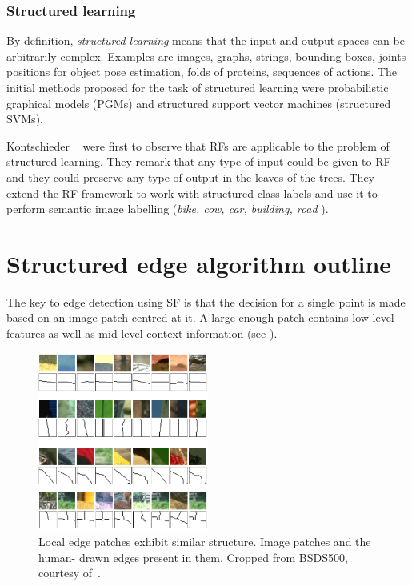 \subsubsection{Structured learning}
By definition, {\it structured learning} means that the input and output spaces can be arbitrarily complex. Examples are images, graphs, strings, bounding boxes, joints positions for object pose estimation, folds of proteins, sequences of actions. The initial methods proposed for the task of structured learning were probabilistic graphical models (PGMs) and structured support vector machines (structured SVMs).

Kontschieder \etal~\cite{KontschiederBBP11} were first to observe that RFs are applicable to the problem of structured learning. They remark that any type of input could be given to RF and they could preserve %
any type of output in the leaves of the trees. They extend the RF framework to work with structured class labels and use it to perform semantic image labelling (\textit{bike, cow, car, building, road \etc}).

\section{Structured edge algorithm outline}
The key to edge detection using SF is that the decision for a single point is made based on an image patch centred at it. A large enough patch contains low-level features as well as mid-level context information (see ).

\begin{figure}[ht!]
\centering
 \includegraphics[width=0.5\textwidth]{images/srf/structure-in-edge-patches.png}
\caption{Local edge patches exhibit similar structure. Image patches and the human-%
drawn edges present in them. Cropped from BSDS500, courtesy of~\cite{DollarICCV13PresentationSlides}.}
\label{fig:srf-structure-in-edge-patches}
\end{figure}

